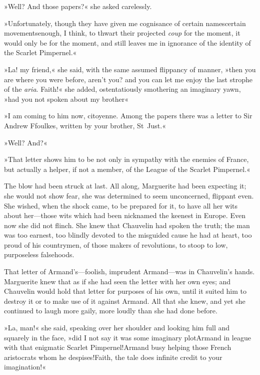 »Well? And those papers?« she asked carelessly.

»Unfortunately, though they have given me cognisance of certain names\textellipsis \allowbreak  certain movements\textellipsis \allowbreak  enough, I think, to thwart their projected \textit{coup} for the moment, it would only be for the moment, and still leaves me in ignorance of the identity of the Scarlet Pimpernel.«

»La! my friend,« she said, with the same assumed flippancy of manner, »then you are where you were before, aren't you? and you can let me enjoy the last strophe of the \textit{aria}. Faith!« she added, ostentatiously smothering an imaginary yawn, »had you not spoken about my brother\textellipsis«

»I am coming to him now, citoyenne. Among the papers there was a letter to Sir Andrew Ffoulkes, written by your brother, St~Just.«

»Well? And?«

»That letter shows him to be not only in sympathy with the enemies of France, but actually a helper, if not a member, of the League of the Scarlet Pimpernel.«

The blow had been struck at last. All along, Marguerite had been expecting it; she would not show fear, she was determined to seem unconcerned, flippant even. She wished, when the shock came, to be prepared for it, to have all her wits about her—those wits which had been nicknamed the keenest in Europe. Even now she did not flinch. She knew that Chauvelin had spoken the truth; the man was too earnest, too blindly devoted to the misguided cause he had at heart, too proud of his countrymen, of those makers of revolutions, to stoop to low, purposeless falsehoods.

That letter of Armand's—foolish, imprudent Armand—was in Chauvelin's hands. Marguerite knew that as if she had seen the letter with her own eyes; and Chauvelin would hold that letter for purposes of his own, until it suited him to destroy it or to make use of it against Armand. All that she knew, and yet she continued to laugh more gaily, more loudly than she had done before.

»La, man!« she said, speaking over her shoulder and looking him full and squarely in the face, »did I not say it was some imaginary plot\textellipsis \allowbreak  Armand in league with that enigmatic Scarlet Pimpernel!\textellipsis \allowbreak  Armand busy helping those French aristocrats whom he despises!\textellipsis \allowbreak  Faith, the tale does infinite credit to your imagination!«

